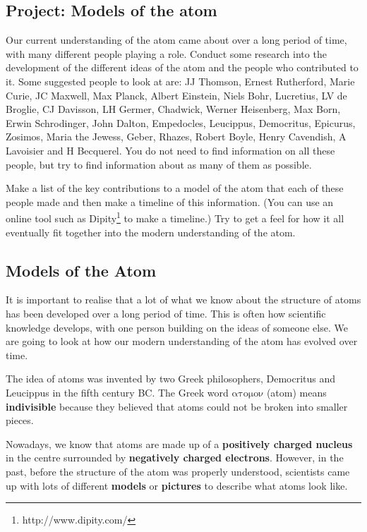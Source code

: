             \subsection{ Project: Models of the atom}
            \nopagebreak
            \label{m38756*eip-3}
Our current understanding of the atom came about over a long period of time, with many different people playing a role. Conduct some research into the development of the different ideas of the atom and the people who contributed to it. Some suggested people to look at are: JJ Thomson, Ernest Rutherford, Marie Curie, JC Maxwell, Max Planck, Albert Einstein, Niels Bohr, Lucretius, LV de Broglie, CJ Davisson, LH Germer, Chadwick, Werner Heisenberg, Max Born, Erwin Schrodinger, John Dalton, Empedocles, Leucippus, Democritus, Epicurus, Zosimos, Maria the Jewess, Geber, Rhazes, Robert Boyle, Henry Cavendish, A Lavoisier and H Becquerel. You do not need to find information on all these people, but try to find information about as many of them as possible.
\par 
\label{m38756*id7342}Make a list of the key contributions to a model of the atom that each of these people made and then make a timeline of this information. (You can use an online tool such as Dipity\footnote{http://www.dipity.com/}
         to make a timeline.) Try to get a feel for how it all eventually fit together into the modern understanding of the atom. 
\par \label{m38756*cid2}
            \subsection{ Models of the Atom}
            \nopagebreak
      \label{m38756*id254164}It is important to realise that a lot of what we know about the structure of atoms has been developed over a long period of time. This is often how scientific knowledge develops, with one person building on the ideas of someone else. We are going to look at how our modern understanding of the atom has evolved over time.\par 
      \label{m38756*id254508}The idea of atoms was invented by two Greek philosophers, Democritus and Leucippus in the fifth century BC. The Greek word $\mathrm{\alpha \tau o\mu o\nu }$ \hspace{1ex} (atom) means \textbf{indivisible} because they believed that atoms could not be broken into smaller pieces.\par 
      \label{m38756*id254540}Nowadays, we know that atoms are made up of a \textbf{positively charged nucleus} in the centre
surrounded by \textbf{negatively charged electrons}. However, in the past, before the structure of the atom was properly understood, scientists came up with lots of different \textbf{models} or \textbf{pictures} to describe what atoms look like.\par 

